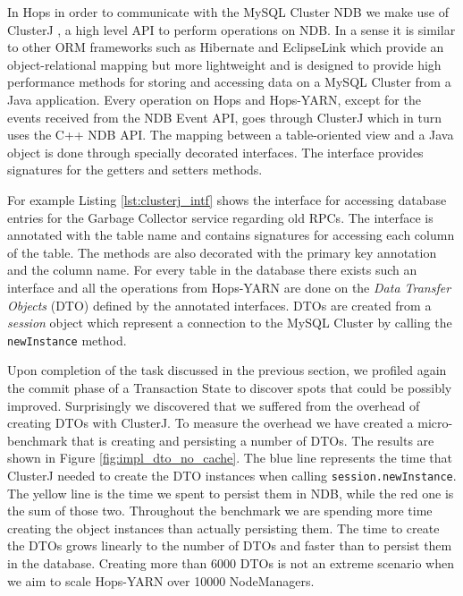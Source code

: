 In Hops in order to communicate with the MySQL Cluster NDB we make use
of ClusterJ \cite{clusterj}, a high level API to perform
operations on NDB. In a sense it is similar to other ORM frameworks
such as Hibernate \cite{hibernate} and EclipseLink \cite{eclipselink}
which provide an object-relational mapping but more lightweight and is
designed to provide high performance methods for storing and accessing
data on a MySQL Cluster from a Java application. Every operation on
Hops and Hops-YARN, except for the events received from the NDB Event
API, goes through ClusterJ which in turn uses the C++ NDB API. The
mapping between a table-oriented view and a Java object is done
through specially decorated interfaces. The interface provides signatures
for the getters and setters methods.

For example Listing \ref{lst:clusterj_intf} shows the interface for
accessing database entries for the Garbage Collector service regarding
old RPCs. The interface is annotated with the table name and contains
signatures for accessing each column of the table. The methods are
also decorated with the primary key annotation and the column
name. For every table in the database there exists such an interface
and all the operations from Hops-YARN are done on the \emph{Data
  Transfer Objects} (DTO) defined
by the annotated interfaces. DTOs are
created from a \emph{session} object which represent a connection to
the MySQL Cluster by calling the \texttt{newInstance} method.



Upon completion of the task discussed in the previous section, we
profiled again the commit phase of a Transaction State to discover
spots that could be possibly improved. Surprisingly we discovered that
we suffered from the overhead of creating DTOs with ClusterJ. To
measure the overhead we have created a micro-benchmark that is
creating and persisting a number of DTOs. The results are shown in
Figure \ref{fig:impl_dto_no_cache}. The blue line represents the time
that ClusterJ needed to create the
DTO instances when calling \texttt{session.newInstance}. The yellow
line is the time we spent to persist them in NDB, while
the red one is the sum of those two. Throughout the benchmark we are spending more
time creating the object instances than actually persisting
them. The time to create the DTOs grows linearly to the number of DTOs
and faster than to persist them in the database. Creating more than
6000 DTOs is not an extreme scenario when we aim to scale Hops-YARN over 10000
NodeManagers.

